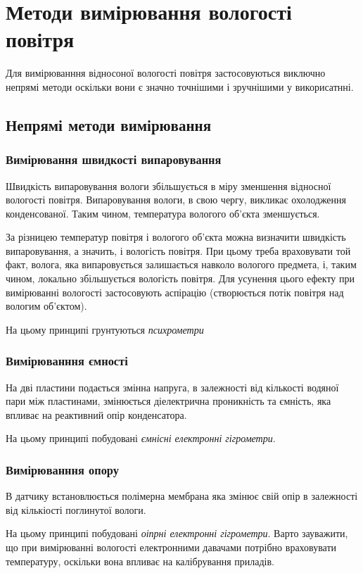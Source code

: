 \chapter{Методи вимірювання вологості повітря}

Для вимірюванння відносоної вологості повітря застосовуються виключно непрямі методи оскільки вони є
значно точнішими і зручнішими у викорисатнні.

\section{Непрямі методи вимірювання}

\subsection{Вимірювання швидкості випаровування}

Швидкість випаровування вологи збільшується в міру зменшення відносної вологості повітря.
Випаровування вологи, в свою чергу, викликає охолодження конденсованої. Таким чином, температура
вологого об'єкта зменшується.

За різницею температур повітря і вологого об'єкта можна визначити
швидкість випаровування, а значить, і вологість повітря. При цьому треба враховувати той факт,
волога, яка випаровується залишається навколо вологого предмета, і, таким чином, локально
збільшується вологість повітря. Для усунення цього ефекту при вимірюванні вологості застосовують
аспірацію (створюється потік повітря над вологим об'єктом).

На цьому принципі грунтуються \textit{психрометри}

\subsection{Вимірюванння ємності}

На дві пластини подається змінна напруга, в залежності від кількості водяної пари між пластинами,
змінюється діелектрична проникність та ємність, яка впливає на реактивний опір конденсатора.

На цьому принципі побудовані \textit{ємнісні електронні гігрометри}.

\subsection{Вимірюванння опору}

В датчику встановлюється полімерна мембрана яка змінює свій опір в залежності від кількіості
поглинутої вологи.

На цьому принципі побудовані \textit{оіпрні електронні гігрометри}. Варто зауважити, що при
вимірюванні вологості електронними давачами потрібно враховувати температуру, оскільки вона впливає
на калібрування приладів.
